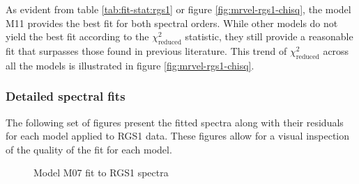 		
			As evident from table \ref{tab:fit-stat:rgs1} or figure \ref{fig:mrvel-rgs1-chisq}, the model M11 provides the best fit for both spectral orders.
			While other models do not yield the best fit according to the $\chi^2_\text{reduced}$ statistic, they still provide a reasonable fit that surpasses those found in previous literature. This trend of $\chi^2_\text{reduced}$ across all the models is illustrated in figure \ref{fig:mrvel-rgs1-chisq}.
			
			\subsubsection*{Detailed spectral fits}		
				The following set of figures present the fitted spectra along with their residuals for each model applied to RGS1 data. These figures allow for a visual inspection of the quality of the fit for each model.
			\begin{figure}[h!]
				\centering
				 \hfill
				\caption{Model M07 fit to RGS1 spectra}
				\label{xmm:rgs1-m07}
			\end{figure}
			
